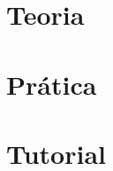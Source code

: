 




\maketitle
\tableofcontents



\part{Teoria}






\part{Prática}




\part{Tutorial}



\appendix

\printindex

